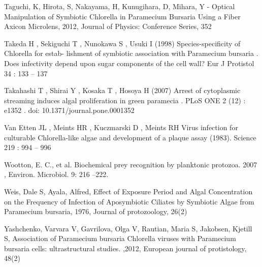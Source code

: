 \documentclass[a4paper,11pt]{article}
\begin{document}
 
\noindent Taguchi, K, Hirota, S, Nakayama, H, Kunugihara, D, Mihara, Y - Optical Manipulation of Symbiotic Chlorella in Paramecium Bursaria Using a Fiber Axicon Microlens, 2012, Journal of Physics: Conference Series, 352

 
\noindent Takeda H , Sekiguchi T , Nunokawa S , Usuki I (1998) Species-specificity of Chlorella for estab- lishment of symbiotic association with Paramecium bursaria . Does infectivity depend upon sugar components of the cell wall? Eur J Protistol 34 : 133 – 137

 
\noindent Takahashi T , Shirai Y , Kosaka T , Hosoya H (2007) Arrest of cytoplasmic streaming induces algal proliferation in green paramecia . PLoS ONE 2 (12) : e1352 . doi: 10.1371/journal.pone.0001352

 
\noindent Van Etten JL , Meints HR , Kuczmarski D , Meints RH  Virus infection for culturable Chlorella-like algae and development of a plaque assay (1983). Science 219 : 994 – 996

 
\noindent Wootton, E. C., et al. Biochemical prey recognition by planktonic protozoa. 2007 , Environ. Microbiol. 9: 216 –222.

 
\noindent Weis, Dale S, Ayala, Alfred, Effect of Exposure Period and Algal Concentration on the Frequency of Infection of Aposymbiotic Ciliates by Symbiotic Algae from Paramecium bursaria, 1976,  Journal of protozoology, 26(2)

 
\noindent Yashchenko, Varvara V, Gavrilova, Olga V,  Rautian, Maria S, Jakobsen, Kjetill S, Association of Paramecium bursaria Chlorella viruses with Paramecium bursaria cells: ultrastructural studies. ,2012,  European journal of protistology, 48(2)
\end{document}
